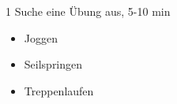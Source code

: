 1 Suche eine Übung aus, 5-10 min 
\begin{itemize}
    \item Joggen
    \item Seilspringen
    \item Treppenlaufen
\end{itemize}